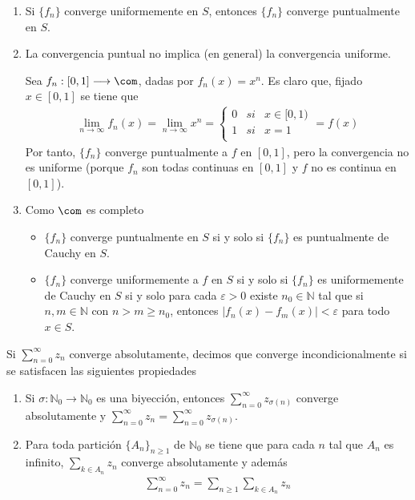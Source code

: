 \begin{obs}
\begin{enumerate}
    \item Si $\{f_n\}$ converge uniformemente en $S$, entonces $\{f_n\}$ converge puntualmente en $S$.
    \item La convergencia puntual no implica (en general) la convergencia uniforme.
    \begin{ejemplo}
Sea $f_n : [0,1] \longrightarrow \com$, dadas por $f_n(x) = x^n$. Es claro que, fijado $x \in [0,1]$ se tiene que
\begin{align*}
    \lim_{n \to \infty}{f_n(x)} = \lim_{n \to \infty}{x^n} = \left\{ \begin{array}{lcc}
            0 & si & x \in [0,1) \\
            1 & si & x = 1\\
             \end{array}
        \right. = f(x)
\end{align*}
    Por tanto, $\{f_n\}$ converge puntualmente a  $f$ en $[0,1]$, pero la convergencia no es uniforme (porque $f_n$ son todas continuas en $[0,1]$ y $f$ no es continua en $[0,1]$).
\end{ejemplo}
\item Como $\com$ es completo
    \begin{itemize}
        \item $\{f_n\}$ converge puntualmente en $S$ si y solo si $\{f_n\}$ es puntualmente de Cauchy en $S$.
        \item $\{f_n\}$ converge uniformemente a $f$ en $S$ si y solo si $\{f_n\}$ es uniformemente de Cauchy en $S$ si y solo para cada $\varepsilon > 0$ existe $n_0 \in \mathbb{N}$ tal que si $n,m \in \mathbb{N}$ con $n > m  \ge n_0$, entonces $|f_n(x) - f_m(x)| < \varepsilon$ para todo $x \in S$.
    \end{itemize}
\end{enumerate}
\end{obs}

\begin{defi}
Si $\sum_{n=0}^{\infty}{z_n}$ converge absolutamente, decimos que converge incondicionalmente si se satisfacen las siguientes propiedades
\begin{enumerate}
    \item Si $\sigma : \mathbb{N}_0 \longrightarrow \mathbb{N}_0$ es una biyección, entonces $\sum_{n=0}^{\infty}{z_{\sigma(n)}}$ converge absolutamente y $\sum_{n=0}^{\infty}{z_n} = \sum_{n=0}^{\infty}{z_{\sigma(n)}}$.
    \item Para toda partición $\{A_n\}_{n \ge 1}$ de $\mathbb{N}_0$ se tiene que para cada $n$ tal que $A_n$ es infinito, $\sum_{k\in A_n}{z_n}$ converge absolutamente y además
    \begin{align*}
        \sum_{n=0}^{\infty}{z_n} = \sum_{n \ge 1}\sum_{k\in A_n}{z_n}
    \end{align*}
\end{enumerate}
\end{defi}

